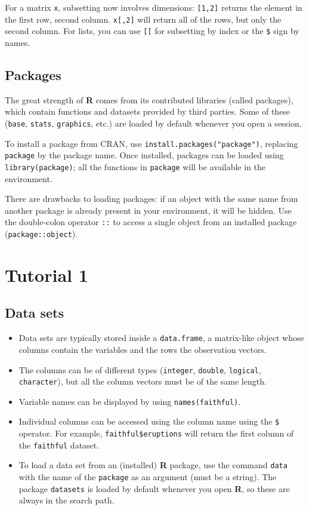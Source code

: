 \documentclass[]{book}
\providecommand{\tightlist}{%
  \setlength{\itemsep}{0pt}\setlength{\parskip}{0pt}}
\theoremstyle{definition}
\theoremstyle{definition}
\theoremstyle{definition}
\theoremstyle{remark}
\let\BeginKnitrBlock\begin \let\EndKnitrBlock\end
\begin{document}
For a matrix \texttt{x}, subsetting now involves dimensions:
\texttt{{[}1,2{]}} returns the element in the first row, second column.
\texttt{x{[},2{]}} will return all of the rows, but only the second
column. For lists, you can use \texttt{{[}{[}} for subsetting by index
or the \texttt{\$} sign by names.

\subsection{Packages}\label{packages}

The great strength of \textbf{R} comes from its contributed libraries
(called packages), which contain functions and datasets provided by
third parties. Some of these (\texttt{base}, \texttt{stats},
\texttt{graphics}, etc.) are loaded by default whenever you open a
session.

To install a package from CRAN, use
\texttt{install.packages("package")}, replacing \texttt{package} by the
package name. Once installed, packages can be loaded using
\texttt{library(package)}; all the functions in \texttt{package} will be
available in the environment.

\BeginKnitrBlock{rmdcaution}
There are drawbacks to loading packages: if an object with the same name
from another package is already present in your environment, it will be
hidden. Use the double-colon operator \texttt{::} to access a single
object from an installed package (\texttt{package::object}).
\EndKnitrBlock{rmdcaution}

\section{Tutorial 1}\label{week1}

\subsection{Data sets}\label{data-sets}

\begin{itemize}
\tightlist
\item
  Data sets are typically stored inside a \texttt{data.frame}, a
  matrix-like object whose columns contain the variables and the rows
  the observation vectors.
\item
  The columns can be of different types (\texttt{integer},
  \texttt{double}, \texttt{logical}, \texttt{character}), but all the
  column vectors must be of the same length.
\item
  Variable names can be displayed by using \texttt{names(faithful)}.
\item
  Individual columns can be accessed using the column name using the
  \texttt{\$} operator. For example, \texttt{faithful\$eruptions} will
  return the first column of the \texttt{faithful} dataset.
\item
  To load a data set from an (installed) \textbf{R} package, use the
  command \texttt{data} with the name of the \texttt{package} as an
  argument (must be a string). The package \texttt{datasets} is loaded
  by default whenever you open \textbf{R}, so these are always in the
  search path.
\end{itemize}
\end{document}
